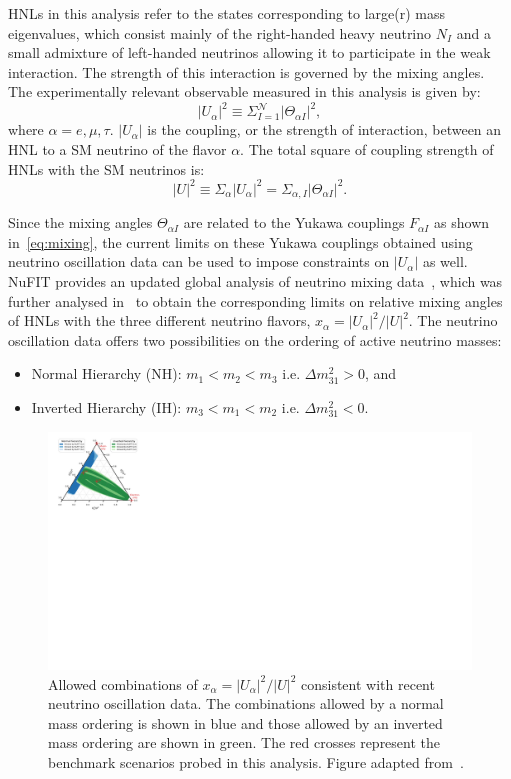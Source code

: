 HNLs in this analysis refer to the states corresponding to large(r) mass eigenvalues, which consist mainly of the right-handed heavy neutrino $N_I$ and a small admixture of left-handed neutrinos allowing it to participate in the weak interaction. The strength of this interaction is governed by the mixing angles. The experimentally relevant observable measured in this analysis is given by:
\begin{equation}
    |U_\alpha|^2 \equiv \Sigma_{I=1}^{\mathcal{N}} |\Theta_{\alpha I}|^2,
\end{equation}
where $\alpha={e,\mu,\tau}$. $|U_\alpha|$ is the coupling, or the strength of interaction, between an HNL to a SM neutrino of the flavor $\alpha$. The total square of coupling strength of HNLs with the SM neutrinos is:
\begin{equation}
    |U|^2 \equiv \Sigma_\alpha |U_\alpha|^2 = \Sigma_{\alpha,I}|\Theta_{\alpha I}|^2.
\end{equation}

Since the mixing angles $\Theta_{\alpha I}$ are related to the Yukawa couplings $F_{\alpha I}$ as shown in~\cref{eq:mixing}, the current limits on these Yukawa couplings obtained using neutrino oscillation data can be used to impose constraints on $|U_\alpha|$ as well. NuFIT provides an updated global analysis of neutrino mixing data~\cite{Esteban2020}, which was further analysed in~\cite{Tastet2021} to obtain the corresponding limits on relative mixing angles of HNLs with the three different neutrino flavors, $x_\alpha = |U_\alpha|^2 / |U|^2$. The neutrino oscillation data offers two possibilities on the ordering of active neutrino masses:
\begin{itemize}
    \item Normal Hierarchy (NH): $m_1 < m_2 < m_3$ i.e. $\Delta m_{31}^2 > 0$, and
    \item Inverted Hierarchy (IH): $m_3 < m_1 < m_2$ i.e. $\Delta m_{31}^2 < 0$.
\end{itemize}

\begin{figure}[!htb]
    \centering
    \includegraphics[width=.6\linewidth]{figures/theory/Jean_Loup_IH_NH_diagram.pdf}
    \caption{Allowed combinations of $x_\alpha = |U_\alpha|^2 / |U|^2$ consistent with recent neutrino oscillation data. The combinations allowed by a normal mass ordering is shown in blue and those allowed by an inverted mass ordering are shown in green. The red crosses represent the benchmark scenarios probed in this analysis. Figure adapted from~\cite{Tastet2021}.}
    \label{fig:IH_NH_diagram}
\end{figure}

